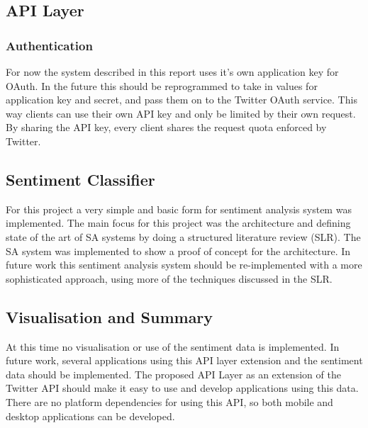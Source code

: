 \subsection{API Layer}

\subsubsection{Authentication}
For now the system described in this report uses it's own application key for OAuth. In the future this should be reprogrammed to take in values for application key and secret, and pass them on to the Twitter OAuth service. This way clients can use their own API key and only be limited by their own request. By sharing the API key, every client shares the request quota enforced by Twitter.


\subsection{Sentiment Classifier}
For this project a very simple and basic form for sentiment analysis system was implemented. The main focus for this project was the architecture and defining state of the art of SA systems by doing a structured literature review (SLR). The SA system was implemented to show a proof of concept for the architecture. In future work this sentiment analysis system should be re-implemented with a more sophisticated approach, using more of the techniques discussed in the SLR. 

\subsection{Visualisation and Summary}

At this time no visualisation or use of the sentiment data is implemented. In future work, several applications using this API layer extension and the sentiment data should be implemented. The proposed API Layer as an extension of the Twitter API should make it easy to use and develop applications using this data. There are no platform dependencies for using this API, so both mobile and desktop applications can be developed. 
